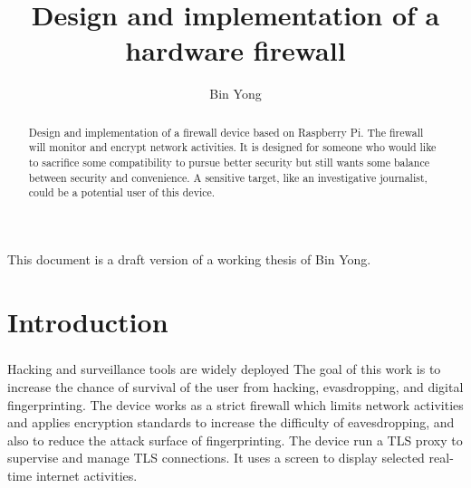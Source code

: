 \documentclass[mscthesis]{usiinfthesis}
\title{Design and implementation of a hardware firewall} %
\author{Bin Yong} %
\begin{document}

\maketitle %

\frontmatter %

\begin{abstract}
  \paragraph{}
  Design and implementation of a firewall device based on Raspberry Pi. The firewall will monitor and encrypt network activities. It is designed for someone who would like to sacrifice some compatibility to pursue better security but still wants some balance between security and convenience. A sensitive target, like an investigative journalist, could be a potential user of this device.

\end{abstract}

\begin{acknowledgements}
  \paragraph{}
  This document is a draft version of a working thesis of Bin Yong.
\end{acknowledgements}

\tableofcontents
\listoffigures %
\listoftables %

\mainmatter

\chapter{Introduction}
\paragraph{}
Hacking and surveillance tools are widely deployed The goal of this work is to increase the chance of survival of the user from hacking, evasdropping, and digital fingerprinting. The device works as a strict firewall which limits network activities and applies encryption standards to increase the difficulty of eavesdropping, and also to reduce the attack surface of fingerprinting. The device run a TLS proxy to supervise and manage TLS connections. It uses a screen to display selected real-time internet activities.
\end{document}
